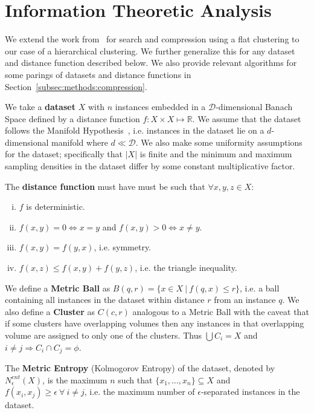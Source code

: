 \section{Information Theoretic Analysis}
\label{sec:information-theoretic-analysis}

We extend the work from~\cite{berger2020levenshtein} for search and compression using a flat clustering to our case of a hierarchical clustering.
We further generalize this for any dataset and distance function described below.
We also provide relevant algorithms for some parings of datasets and distance functions in Section~\ref{subsec:methods:compression}.

We take a \textbf{dataset} $X$ with $n$ instances embedded in a $\mathcal{D}$-dimensional Banach Space defined by a distance function $f: X \times X \mapsto \mathbb{R}$.
We assume that the dataset follows the Manifold Hypothesis~\cite{fefferman2016testing}, i.e. instances in the dataset lie on a $d$-dimensional manifold where $d \ll \mathcal{D}$.
We also make some uniformity assumptions for the dataset;
specifically that $|X|$ is finite and the minimum and maximum sampling densities in the dataset differ by some constant multiplicative factor.

The \textbf{distance function} must have must be such that $\forall x, y, z \in X$:
\begin{enumerate}[i.]
    \item $f$ is deterministic.
    \item $f(x, y) = 0 \Leftrightarrow x = y$ and $f(x, y) > 0 \Leftrightarrow x \neq y$.
    \item $f(x, y) = f(y, x)$, i.e. symmetry.
    \item $f(x, z) \leq f(x, y) + f(y, z)$, i.e. the triangle inequality.
\end{enumerate}


We define a \textbf{Metric Ball} as $B(q, r) = \{ x \in X \ | \ f(q, x) \leq r \}$, i.e. a ball containing all instances in the dataset within distance $r$ from an instance $q$.
We also define a \textbf{Cluster} as $C(c, r)$ analogous to a Metric Ball with the caveat that if some clusters have overlapping volumes then any instances in that overlapping volume are assigned to only one of the clusters.
Thus $\bigcup C_i = X$ and $i \neq j \Rightarrow C_i \cap C_j = \phi$.

The \textbf{Metric Entropy} (Kolmogorov Entropy) of the dataset, denoted by $N_{\epsilon}^{ent}(X)$, is the maximum $n$ such that $\{x_1, \dots, x_n\} \subseteq X$ and $f(x_i, x_j) \geq \epsilon \ \forall \ i \neq j$, i.e. the maximum number of $\epsilon$-separated instances in the dataset.

